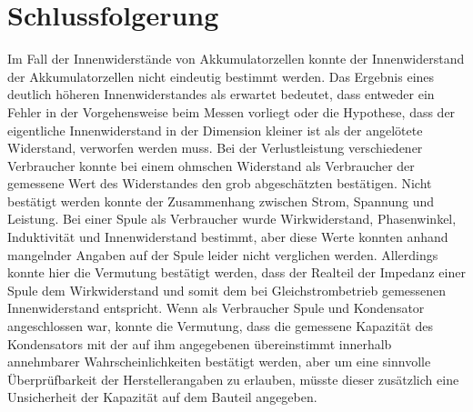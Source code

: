 \documentclass[
	a4paper,
	12pt,
	pagesize,
	ngerman
]{scrartcl}
\begin{document}
	\section{Schlussfolgerung}
	Im Fall der Innenwiderstände von Akkumulatorzellen konnte der Innenwiderstand der Akkumulatorzellen nicht eindeutig bestimmt werden.
	Das Ergebnis eines deutlich höheren Innenwiderstandes als erwartet bedeutet, dass entweder ein Fehler in der Vorgehensweise beim Messen vorliegt oder die Hypothese, dass der eigentliche Innenwiderstand in der Dimension kleiner ist als der angelötete Widerstand, verworfen werden muss.
	Bei der Verlustleistung verschiedener Verbraucher konnte bei einem ohmschen Widerstand als Verbraucher der gemessene Wert des Widerstandes den grob abgeschätzten bestätigen.
	Nicht bestätigt werden konnte der Zusammenhang zwischen Strom, Spannung und Leistung.
	Bei einer Spule als Verbraucher wurde Wirkwiderstand, Phasenwinkel, Induktivität und Innenwiderstand bestimmt, aber diese Werte konnten anhand mangelnder Angaben auf der Spule leider nicht verglichen werden.
	Allerdings konnte hier die Vermutung bestätigt werden, dass der Realteil der Impedanz einer Spule dem Wirkwiderstand und somit dem bei Gleichstrombetrieb gemessenen Innenwiderstand entspricht.
	Wenn als Verbraucher Spule und Kondensator angeschlossen war, konnte die Vermutung, dass die gemessene Kapazität des Kondensators mit der auf ihm angegebenen übereinstimmt innerhalb annehmbarer Wahrscheinlichkeiten bestätigt werden, aber um eine sinnvolle Überprüfbarkeit der Herstellerangaben zu erlauben, müsste dieser zusätzlich eine Unsicherheit der Kapazität auf dem Bauteil angegeben.
	
\end{document}
